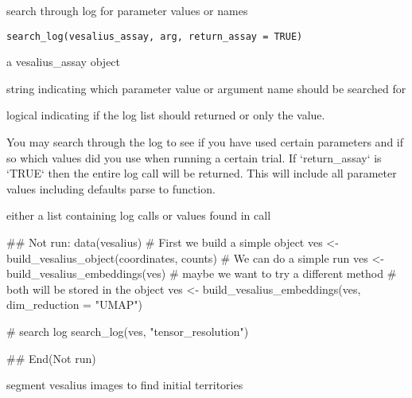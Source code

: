 \documentclass[a4paper]{book}
\begin{document}
%
\begin{Description}
search through log for parameter values or names
\end{Description}
%
\begin{Usage}
\begin{verbatim}
search_log(vesalius_assay, arg, return_assay = TRUE)
\end{verbatim}
\end{Usage}
%
\begin{Arguments}
\begin{ldescription}
\item[\code{vesalius\_assay}] a vesalius\_assay object

\item[\code{arg}] string indicating which parameter value or argument name
should be searched for

\item[\code{return\_assay}] logical indicating if the log list
should returned or only the value.
\end{ldescription}
\end{Arguments}
%
\begin{Details}
You may search through the log to see if you have used
certain parameters and if so which values did you use when running a
certain trial.
If `return\_assay` is `TRUE` then the entire log call will be returned.
This will include all parameter values including defaults parse to 
function.
\end{Details}
%
\begin{Value}
either a list containing log calls or values found in call
\end{Value}
%
\begin{Examples}
\begin{ExampleCode}
## Not run: 
data(vesalius)
# First we build a simple object
ves <- build_vesalius_object(coordinates, counts)
# We can do a simple run 
ves <- build_vesalius_embeddings(ves)
# maybe we want to try a different method 
# both will be stored in the object
ves <- build_vesalius_embeddings(ves, dim_reduction = "UMAP")

# search log 
search_log(ves, "tensor_resolution")

## End(Not run)
\end{ExampleCode}
\end{Examples}
%
\begin{Description}
segment vesalius images to find initial territories
\end{Description}
\end{document}
